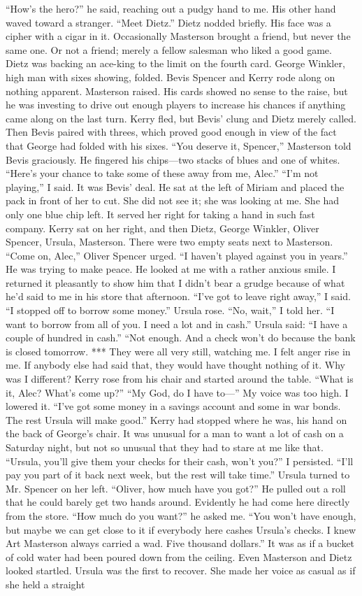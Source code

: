 \documentclass{novel}
\begin{document}
“How’s the hero?” he said, reaching out a pudgy hand to me. His other hand waved toward a stranger. “Meet Dietz.” Dietz nodded briefly. His face was a cipher with a cigar in it. Occasionally Masterson brought a friend, but never the same one. Or not a friend; merely a fellow salesman who liked a good game. Dietz was backing an ace-king to the limit on the fourth card. George Winkler, high man with sixes showing, folded. Bevis Spencer and Kerry rode along on nothing apparent. Masterson raised. His cards showed no sense to the raise, but he was investing to drive out enough players to increase his chances if anything came along on the last turn. Kerry fled, but Bevis’ clung and Dietz merely called. Then Bevis paired with threes, which proved good enough in view of the fact that George had folded with his sixes. “You deserve it, Spencer,” Masterson told Bevis graciously. He fingered his chips—two stacks of blues and one of whites. “Here’s your chance to take some of these away from me, Alec.” “I’m not playing,” I said. It was Bevis’ deal. He sat at the left of Miriam and placed the pack in front of her to cut. She did not see it; she was looking at me. She had only one blue chip left. It served her right for taking a hand in such fast company. Kerry sat on her right, and then Dietz, George Winkler, Oliver Spencer, Ursula, Masterson. There were two empty seats next to Masterson. “Come on, Alec,” Oliver Spencer urged. “I haven’t played against you in years.” He was trying to make peace. He looked at me with a rather anxious smile. I returned it pleasantly to show him that I didn’t bear a grudge because of what he’d said to me in his store that afternoon. “I’ve got to leave right away,” I said. “I stopped off to borrow some money.” Ursula rose. “No, wait,” I told her. “I want to borrow from all of you. I need a lot and in cash.” Ursula said: “I have a couple of hundred in cash.” “Not enough. And a check won’t do because the bank is closed tomorrow. *** They were all very still, watching me. I felt anger rise in me. If anybody else had said that, they would have thought nothing of it. Why was I different? Kerry rose from his chair and started around the table. “What is it, Alec? What’s come up?” “My God, do I have to—” My voice was too high. I lowered it. “I’ve got some money in a savings account and some in war bonds. The rest Ursula will make good.” Kerry had stopped where he was, his hand on the back of George’s chair. It was unusual for a man to want a lot of cash on a Saturday night, but not so unusual that they had to stare at me like that. “Ursula, you’ll give them your checks for their cash, won’t you?” I persisted. “I’ll pay you part of it back next week, but the rest will take time.” Ursula turned to Mr. Spencer on her left. “Oliver, how much have you got?” He pulled out a roll that he could barely get two hands around. Evidently he had come here directly from the store. “How much do you want?” he asked me. “You won’t have enough, but maybe we can get close to it if everybody here cashes Ursula’s checks. I knew Art Masterson always carried a wad. Five thousand dollars.” It was as if a bucket of cold water had been poured down from the ceiling. Even Masterson and Dietz looked startled. Ursula was the first to recover. She made her voice as casual as if she held a straight 
\end{document}
